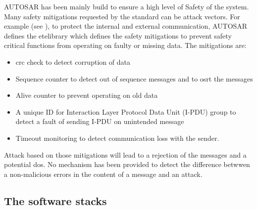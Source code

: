 AUTOSAR has been mainly build to ensure a high level of Safety of the system. Many safety mitigations requested by the standard can be attack vectors. For example (see \cite{Nas2017}), to protect the internal and external communication, AUTOSAR defines the \Gls{ete}\@ library which defines the safety mitigations to prevent safety critical functions from operating on faulty or missing data. The mitigations are:
\begin{itemize}
    \item \Gls{crc} check to detect corruption of data
    \item Sequence counter to detect out of sequence messages and to osrt the messages
    \item Alive counter to prevent operating on old data
    \item A unique ID for Interaction Layer Protocol Data Unit (I-PDU) group to detect a fault of sending I-PDU on unintended message
    \item Timeout monitoring to detect communication loss with the sender.
\end{itemize}

Attack based on those mitigations will lead to a rejection of the messages and a potential \Gls{dos}\@. No mechanism has been provided to detect the difference betwwen a non-malicious errors in the content of a message and an attack.




\subsection {The software stacks}

